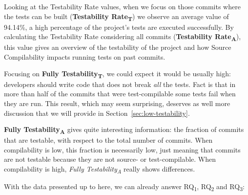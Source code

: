 Looking at the Testability Rate values, when we focus on those commits where the tests can be built (\textbf{Testability Rate\textsubscript{T}}) we observe an average value of 94.14\%, a high percentage of the project's tests are executed successfully. 
By calculating the Testability Rate considering all commits (\textbf{Testability Rate\textsubscript{A}}), this value gives an overview of the testability of the project and how Source Compilability impacts running tests on past commits.

Focusing on \textbf{Fully Testability\textsubscript{T}}, we could expect it would be usually high: developers should write code that does not break \textit{all} the tests. 
Fact is that in more than half of the commits that were test-compilable some tests fail when they are run. 
This result, which may seem surprising, deserves as well more discussion that we will provide in Section~\ref{sec:low-testability}.

\textbf{Fully Testability\textsubscript{A}} gives quite interesting information: the fraction of commits that are testable, with respect to the total number of commits. 
When compilability is low, this fraction is necessarily low, just meaning that commits are not testable because they are not source- or test-compilable. 
When compilability is high, \textit{Fully Testability\textsubscript{A}} really shows differences. 

With the data presented up to here, we can already answer RQ\textsubscript{1}, RQ\textsubscript{2} and RQ\textsubscript{3}:

\vspace{0.5cm}

\vspace{0.5cm}

